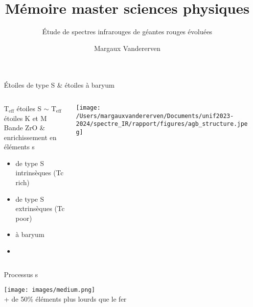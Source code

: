 \documentclass[10pt]{beamer}
\title{Mémoire master sciences physiques}
\subtitle{Étude de spectres infrarouges de géantes rouges évoluées}
\date{}
\author{\small Margaux Vandererven}
\institute{\small Supervisé par Sophie Van Eck}
\begin{document}
\maketitle


\begin{frame}[fragile]{Étoiles de type S \& étoiles à baryum}

    \begin{columns}
            \begin{column}{0.5\textwidth}
                    T$_{\text{eff}}$ étoiles S $\sim$ T$_{\text{eff}}$ étoiles K et M \\

                    Bande ZrO \& enrichissement en éléments s \\
    					\begin{itemize}
    						\item de type S intrinsèques (Tc rich)
    						\item de type S extrinsèques (Tc poor)
    						\item à baryum
    						\item[] 
    					\end{itemize} 
            \end{column}
            \begin{column}{0.5\textwidth}
                \centering
                \texttt{[image: /Users/margauxvandererven/Documents/unif2023-2024/spectre\_IR/rapport/figures/agb\_structure.jpeg]}
            \end{column}
    \end{columns}
\end{frame}

\begin{frame}[fragile]{Processus s}

    \begin{center}
        \texttt{[image: images/medium.png]} \\
        + de 50\% éléments plus lourds que le fer \\
    \end{center}
\end{frame}
\end{document}
